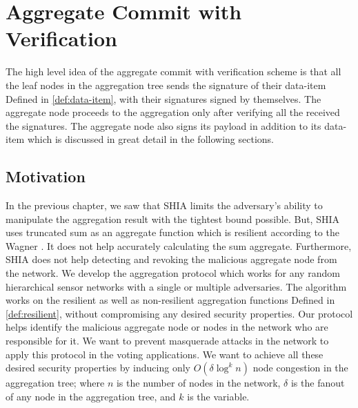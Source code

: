 \chapter{Aggregate Commit with Verification} %
\label{cha:A Protocol for Commitment Tree Generation}
	The high level idea of the aggregate commit with verification scheme is that all the leaf nodes in the aggregation tree sends the signature of their data-item Defined in \ref{def:data-item}, with their signatures signed by themselves.
	The aggregate node proceeds to the aggregation only after verifying all the received the signatures.
	The aggregate node also signs its payload in addition to its data-item which is discussed in great detail in the following sections.
\section{Motivation}	
	In the previous chapter, we saw that SHIA limits the adversary's ability to manipulate the aggregation result with the tightest bound possible.
	But, SHIA uses truncated sum as an aggregate function which is resilient according to the Wagner \cite{wagner2004resilient}.
	It does not help accurately calculating the sum aggregate. 
	Furthermore, SHIA does not help detecting and revoking the malicious aggregate node from the network.
	We develop the aggregation protocol which works for any random hierarchical sensor networks with a single or multiple adversaries.
	The algorithm works on the resilient as well as non-resilient aggregation functions Defined in \ref{def:resilient}, without compromising any desired security properties.
	Our protocol helps identify the malicious aggregate node or nodes in the network who are responsible for it.
	We want to prevent masquerade attacks in the network to apply this protocol in the voting applications.
	We want to achieve all these desired security properties by inducing only $O(\delta \log^{k} n)$ node congestion in the aggregation tree; where $n$ is the number of nodes in the network, $\delta$ is the fanout of any node in the aggregation tree, and $k$ is the variable.
	

